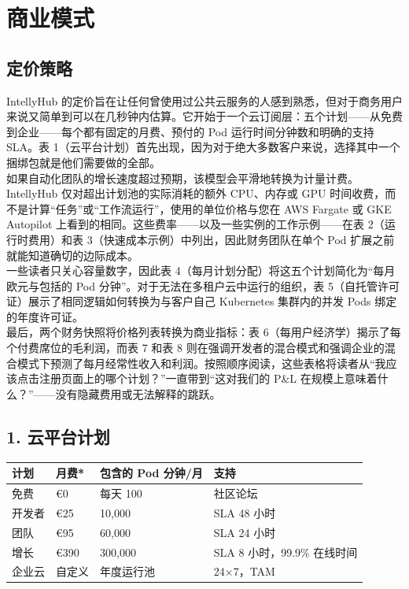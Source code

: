 \documentclass[11pt, a4paper, oneside]{article}
\begin{document}
\section{商业模式}
\subsection{定价策略}
IntellyHub 的定价旨在让任何曾使用过公共云服务的人感到熟悉，但对于商务用户来说又简单到可以在几秒钟内估算。它开始于一个云订阅层：五个计划——从免费到企业——每个都有固定的月费、预付的 Pod 运行时间分钟数和明确的支持 SLA。表 1（云平台计划）首先出现，因为对于绝大多数客户来说，选择其中一个捆绑包就是他们需要做的全部。\\

如果自动化团队的增长速度超过预期，该模型会平滑地转换为计量计费。IntellyHub 仅对超出计划池的实际消耗的额外 CPU、内存或 GPU 时间收费，而不是计算“任务”或“工作流运行”，使用的单位价格与您在 AWS Fargate 或 GKE Autopilot 上看到的相同。这些费率——以及一些实例的工作示例——在表 2（运行时费用）和表 3（快速成本示例）中列出，因此财务团队在单个 Pod 扩展之前就能知道确切的边际成本。\\

一些读者只关心容量数字，因此表 4（每月计划分配）将这五个计划简化为“每月欧元与包括的 Pod 分钟”。对于无法在多租户云中运行的组织，表 5（自托管许可证）展示了相同逻辑如何转换为与客户自己 Kubernetes 集群内的并发 Pods 绑定的年度许可证。\\

最后，两个财务快照将价格列表转换为商业指标：表 6（每用户经济学）揭示了每个付费席位的毛利润，而表 7 和表 8 则在强调开发者的混合模式和强调企业的混合模式下预测了每月经常性收入和利润。按照顺序阅读，这些表格将读者从“我应该点击注册页面上的哪个计划？”一直带到“这对我们的 P\&L 在规模上意味着什么？”——没有隐藏费用或无法解释的跳跃。

\subsection*{1. 云平台计划}
\begin{center}
\begin{tabular}{@{}llll@{}}
\toprule
\textbf{计划} & \textbf{月费*} & \textbf{包含的 Pod 分钟/月} & \textbf{支持} \\
\midrule
免费 & €0 & 每天 100 & 社区论坛 \\
开发者 & €25 & 10,000 & SLA 48 小时 \\
团队 & €95 & 60,000 & SLA 24 小时 \\
增长 & €390 & 300,000 & SLA 8 小时，99.9\% 在线时间 \\
企业云 & 自定义 & 年度运行池 & 24×7，TAM \\
\bottomrule
\end{tabular}
\end{center}
\end{document}
